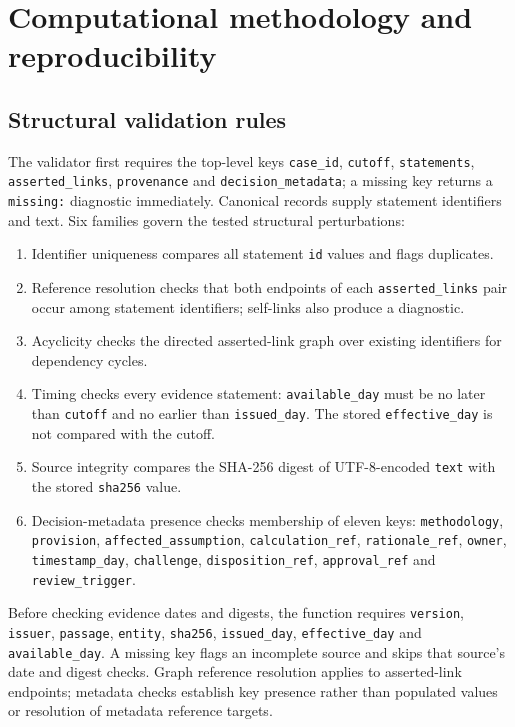 \documentclass[11pt,a4paper]{article}
\begin{document}
\section{Computational methodology and reproducibility}

\subsection{Structural validation rules}

The validator first requires the top-level keys \nolinkurl{case_id}, \nolinkurl{cutoff}, \nolinkurl{statements}, \nolinkurl{asserted_links}, \nolinkurl{provenance} and \nolinkurl{decision_metadata}; a missing key returns a \nolinkurl{missing:} diagnostic immediately. Canonical records supply statement identifiers and text. Six families govern the tested structural perturbations:
\begin{enumerate}[leftmargin=*,nosep]
\item Identifier uniqueness compares all statement \nolinkurl{id} values and flags duplicates.
\item Reference resolution checks that both endpoints of each \nolinkurl{asserted_links} pair occur among statement identifiers; self-links also produce a diagnostic.
\item Acyclicity checks the directed asserted-link graph over existing identifiers for dependency cycles.
\item Timing checks every evidence statement: \nolinkurl{available_day} must be no later than \nolinkurl{cutoff} and no earlier than \nolinkurl{issued_day}. The stored \nolinkurl{effective_day} is not compared with the cutoff.
\item Source integrity compares the SHA-256 digest of UTF-8-encoded \nolinkurl{text} with the stored \nolinkurl{sha256} value.
\item {\raggedright Decision-metadata presence checks membership of eleven keys: \texttt{methodology}, \texttt{provision}, \texttt{affected\_assumption}, \texttt{calculation\_ref}, \texttt{rationale\_ref}, \texttt{owner}, \texttt{timestamp\_day}, \texttt{challenge}, \texttt{disposition\_ref}, \texttt{approval\_ref} and \texttt{review\_trigger}.\par}
\end{enumerate}

Before checking evidence dates and digests, the function requires \nolinkurl{version}, \nolinkurl{issuer}, \nolinkurl{passage}, \nolinkurl{entity}, \nolinkurl{sha256}, \nolinkurl{issued_day}, \nolinkurl{effective_day} and \nolinkurl{available_day}. A missing key flags an incomplete source and skips that source's date and digest checks. Graph reference resolution applies to asserted-link endpoints; metadata checks establish key presence rather than populated values or resolution of metadata reference targets.
\end{document}
